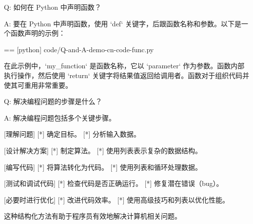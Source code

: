 Q:
  如何在 Python 中声明函数？

A:
  要在 Python 中声明函数，使用 `def` 关键字，后跟函数名称和参数。以下是一个函数声明的示例：

  == [python] {code/Q-and-A-demo-cn-code-func.py}

  在此示例中，`my\_function` 是函数名称，它以 `parameter` 作为参数。函数内部执行操作，然后使用 `return` 关键字将结果值返回给调用者。函数对于组织代码并使其可重用非常重要。

Q:
  解决编程问题的步骤是什么？

A:
  解决编程问题包括多个关键步骤。

  [理解问题]
    [*] 确定目标。
    [*] 分析输入数据。

  [设计解决方案]
    [*] 制定算法。
    [*] 使用列表表示复杂的数据结构。

  [编写代码]
    [*] 将算法转化为代码。
    [*] 使用列表和循环处理数据。

  [测试和调试代码]
    [*] 检查代码是否正确运行。
    [*] 修复潜在错误（bug）。

  [必要时进行优化]
    [*] 改进代码效率。
    [*] 使用高级技巧和列表以优化性能。

  这种结构化方法有助于程序员有效地解决计算机相关问题。
